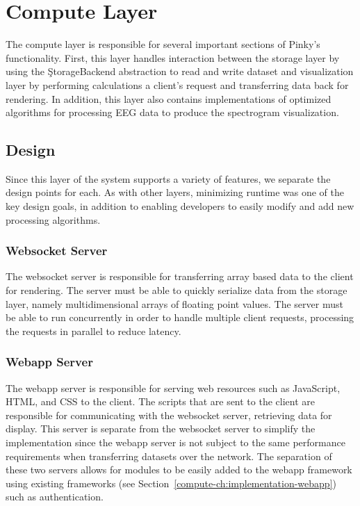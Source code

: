 \chapter{Compute Layer}\label{compute-ch}

The compute layer is responsible for several important sections of Pinky's
functionality. First, this layer handles interaction between the storage layer
by using the \c{StorageBackend} abstraction to read and write dataset and
visualization layer by performing calculations a client's request and
transferring data back for rendering. In addition, this layer also contains
implementations of optimized algorithms for processing EEG data to produce the
spectrogram visualization.

\section{Design}

Since this layer of the system supports a variety of features, we separate the
design points for each. As with other layers, minimizing runtime was one of the
key design goals, in addition to enabling developers to easily modify and add
new processing algorithms.

\subsection{Websocket Server}

The websocket server is responsible for transferring array based data to the
client for rendering. The server must be able to quickly serialize data from
the storage layer, namely multidimensional arrays of floating point values. The
server must be able to run concurrently in order to handle multiple client
requests, processing the requests in parallel to reduce latency.

\subsection{Webapp Server}

The webapp server is responsible for serving web resources such as JavaScript,
HTML, and CSS to the client. The scripts that are sent to the client are
responsible for communicating with the websocket server, retrieving data for
display. This server is separate from the websocket server to simplify the
implementation since the webapp server is not subject to the same performance
requirements when transferring datasets over the network. The separation of
these two servers allows for modules to be easily added to the webapp framework
using existing frameworks (see Section~\ref{compute-ch:implementation-webapp})
such as authentication.

